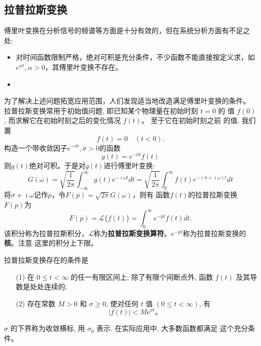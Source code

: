 \subsection{拉普拉斯变换}
\label{subsec:laplace_transform}

傅里叶变换在分析信号的频谱等方面是十分有效的，但在系统分析方面有不足之处:

\begin{itemize}
    \item 对时间函数限制严格，绝对可积是充分条件，不少函数不能直接按定义求，如$e^{\alpha t}, \alpha > 0$，其傅里叶变换不存在。

    \item  
\end{itemize}
为了解决上述问题拓宽应用范围，人们发现适当地改造满足傅里叶变换的条件。
拉普拉斯变换常用于初始值问题, 即已知某个物理量在初始时刻 $t=0$ 的 值 $f(0)$, 而求解它在初始时刻之后的变化情况 $f(t)$。
 至于它在初始时刻之前 的值, 我们置
$$
f(t)=0 \quad(t<0) .
$$
构造一个带收敛因子$e^{-\sigma t}, \sigma > 0$的函数
$$
g(t) =e^{-\sigma t} f(t)
$$
则$g(t)$绝对可积。于是对$g(t)$进行傅里叶变换:
\begin{equation}
    G(\omega) = \sqrt{\frac{1}{2\pi} } \int_{-\infty}^{\infty} g(t) e^{-\imath \omega t} dt 
    = \sqrt{\frac{1}{2\pi} } \int_{0}^{\infty} f(t) e^{-(\sigma + \imath \omega) t} dt  
\end{equation}
将$\sigma + \imath \omega$记作$p$，令$F(p)=\sqrt{2\pi}G(\omega)$，则有
函数$f(t)$的拉普拉斯变换$F(p)$为
\begin{equation}
    F(p) = \mathcal{L} \{ f(t) \} = \int_0 ^{\infty} e^{-pt} f(t) dt .
\end{equation}
该积分称为拉普拉斯积分，$\mathcal{L}$称为\textbf{拉普拉斯变换算符}。$e^{-pt}$称为拉普拉斯变换的\textbf{核}。注意
这里的积分上下限。

拉普拉斯变换存在的条件是 
\begin{enumerate}
    \item[(1)]  在 $0 \leqslant t<\infty$ 的任一有限区间上; 除了有限个间断点外, 函数 $f(t)$ 及其导数是处处连续的;
    \item[(2)]  存在常数 $M>0$ 和 $\sigma \geqslant 0$, 使对任何 $t$ 值 $(0 \leqslant t<\infty)$, 有
    $$
    |f(t)|<M \mathrm{e}^{\sigma t} \text {。 }
    $$
\end{enumerate}
$\sigma$ 的下界称为收敛横标, 用 $\sigma_0$ 表示. 在实际应用中, 大多数函数都满足 这个充分条件。

